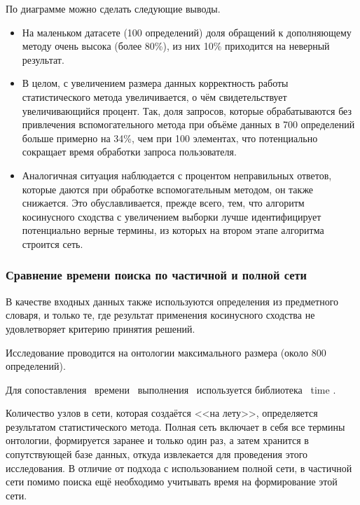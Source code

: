 По диаграмме можно сделать следующие выводы.
\begin{itemize}
	\item На маленьком датасете (100 определений) доля обращений к дополняющему методу очень высока (более 80\%), из них 10\% приходится на неверный результат.
	
	\item В целом, с увеличением размера данных корректность работы статистического метода увеличивается, о чём свидетельствует увеличивающийся процент. Так, доля запросов, которые обрабатываются без привлечения вспомогательного метода при объёме данных в 700 определений больше примерно на 34\%, чем при 100 элементах, что потенциально сокращает время обработки запроса пользователя.
	
	\item Аналогичная ситуация наблюдается с процентом неправильных ответов, которые даются при обработке вспомогательным методом, он также снижается. Это обуславливается, прежде всего, тем, что алгоритм косинусного сходства с увеличением выборки лучше идентифицирует потенциально верные термины, из которых на втором этапе алгоритма строится сеть. \newline
\end{itemize}

\subsubsection{Сравнение времени поиска по частичной и полной сети}
В качестве входных данных также используются определения из предметного словаря, и только те, где результат применения косинусного сходства не удовлетворяет критерию принятия решений. 

Исследование проводится на онтологии максимального размера (около 800 определений).

Для сопоставления \, времени \, выполнения \, используется библиотека \, time \cite{time}. 

Количество узлов в сети, которая создаётся <<на лету>>, определяется результатом статистического метода. Полная сеть включает в себя все термины онтологии, формируется заранее и только один раз, а затем хранится в сопутствующей базе данных, откуда извлекается для проведения этого исследования. В отличие от подхода с использованием полной сети, в частичной сети помимо поиска ещё необходимо учитывать время на формирование этой сети. 

